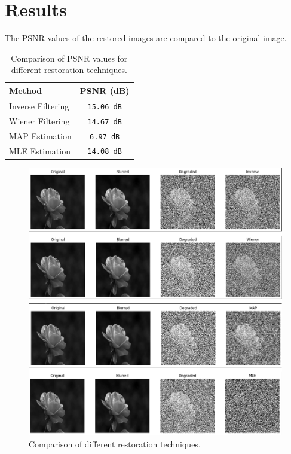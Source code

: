 \documentclass{report}
\begin{document}
\section{Results}
The PSNR values of the restored images are compared to the original image.

\begin{table}[h]
    \centering
    \begin{tabular}{l c}
        \toprule
        \textbf{Method} & \textbf{PSNR (dB)} \\
        \midrule
        Inverse Filtering &  \texttt{15.06 dB} \\
        Wiener Filtering  &  \texttt{14.67 dB} \\
        MAP Estimation    &  \texttt{6.97 dB} \\
        MLE Estimation    &  \texttt{14.08 dB} \\
        \bottomrule
    \end{tabular}
    \caption{Comparison of PSNR values for different restoration techniques.}
    \label{tab:psnr}
\end{table}

\begin{figure}[h]
    \centering
    \includegraphics[width=\textwidth]{images/Exp-10-Results.png}
    \caption{Comparison of different restoration techniques.}
    \label{fig:results}
\end{figure}
\end{document}
